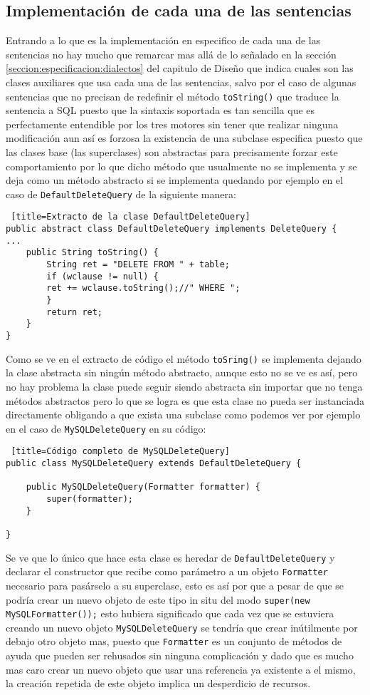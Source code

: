 \subsection{Implementación de cada una de las sentencias}
Entrando a lo que es la implementación en especifico de cada una de las sentencias no hay mucho que remarcar mas allá de lo señalado en la sección \ref{seccion:especificacion:dialectos} del capitulo de Diseño que indica cuales son las clases auxiliares que usa cada una de las sentencias, salvo por el caso de algunas sentencias que no precisan de redefinir el método \verb=toString()= que traduce la sentencia a SQL puesto que la sintaxis soportada es tan sencilla que es perfectamente entendible por los tres motores sin tener que realizar ninguna modificación aun así es forzosa la existencia de una subclase especifica puesto que las clases base (las superclases) son abstractas para precisamente forzar este comportamiento por lo que dicho método que usualmente no se implementa y se deja como un método abstracto si se implementa quedando por ejemplo en el caso de \verb=DefaultDeleteQuery= de la siguiente manera:
%
\begin{lstlisting} [title=Extracto de la clase DefaultDeleteQuery]
public abstract class DefaultDeleteQuery implements DeleteQuery {
...
	public String toString() {
		String ret = "DELETE FROM " + table;
		if (wclause != null) {
		ret += wclause.toString();//" WHERE ";
		}
		return ret;
	}
}
\end{lstlisting}
%
Como se ve en el extracto de código el método \verb=toSring()= se implementa dejando la clase abstracta sin ningún método abstracto, aunque esto no se ve es así, pero no hay problema la clase puede seguir siendo abstracta sin importar que no tenga métodos abstractos pero lo que se logra es que esta clase no pueda ser instanciada directamente obligando a que exista una subclase como podemos ver por ejemplo en el caso de \verb=MySQLDeleteQuery= en su código:
%
\begin{lstlisting} [title=Código completo de MySQLDeleteQuery]
public class MySQLDeleteQuery extends DefaultDeleteQuery {

	public MySQLDeleteQuery(Formatter formatter) {
		super(formatter);
	}

}
\end{lstlisting}
%
Se ve que lo único que hace esta clase es heredar de \verb=DefaultDeleteQuery= y declarar el constructor que recibe como parámetro a un objeto \verb=Formatter= necesario para pasárselo a su superclase, esto es así por que a pesar de que se podría crear un nuevo objeto de este tipo in situ del modo \verb=super(new MySQLFormatter());= esto hubiera significado que cada vez que se estuviera creando un nuevo objeto \verb=MySQLDeleteQuery= se tendría que crear inútilmente por debajo otro objeto mas, puesto que \verb=Formatter= es un conjunto de métodos de ayuda que pueden ser rehusados sin ninguna complicación y dado que es mucho mas caro crear un nuevo objeto que usar una referencia ya existente a el mismo, la creación repetida de este objeto implica un desperdicio de recursos.

